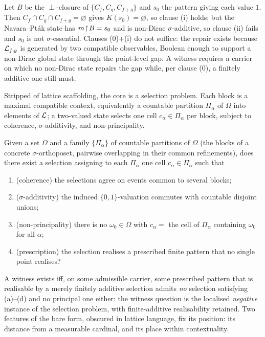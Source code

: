 \begin{remark}\label{rem:np-builds-rescuer}
Let $B$ be the $\perp$-closure of $\{C_f, C_g, C_{f+g}\}$ and $s_0$ the pattern
giving each value $1$. Then $C_f\cap C_g\cap C_{f+g}=\varnothing$ gives
$K(s_0)=\varnothing$, so clause (i) holds; but the Navara--Pt\'ak state has
$m\!\restriction\! B=s_0$ and is non-Dirac $\sigma$-additive, so clause (ii) fails and
$s_0$ is not $\sigma$-essential. Clauses (0)+(i) do not suffice: the repair
exists because $\mathcal{L}_{f,g}$ is generated by two compatible observables, Boolean
enough to support a non-Dirac global state through the point-level gap. A witness
requires a carrier on which no non-Dirac state repairs the gap while, per clause
(0), a finitely additive one still must.
\end{remark}

Stripped of lattice scaffolding, the core is a selection problem. Each block is
a maximal compatible context, equivalently a countable partition $\Pi_\alpha$ of
$\Omega$ into elements of $\mathcal{L}$; a two-valued state selects one cell
$c_\alpha\in\Pi_\alpha$ per block, subject to coherence, $\sigma$-additivity, and
non-principality.

\begin{question}\label{q:bare}
Given a set $\Omega$ and a family $\{\Pi_\alpha\}$ of countable partitions of
$\Omega$ (the blocks of a concrete $\sigma$-orthoposet, pairwise overlapping in
their common refinements), does there exist a selection assigning to each
$\Pi_\alpha$ one cell $c_\alpha\in\Pi_\alpha$ such that
\begin{enumerate}[label=\textup{(\alph*)}]
  \item (coherence) the selections agree on events common to several blocks;
  \item ($\sigma$-additivity) the induced $\{0,1\}$-valuation commutes with
    countable disjoint unions;
  \item (non-principality) there is no $\omega_0\in\Omega$ with $c_\alpha=$ the
    cell of $\Pi_\alpha$ containing $\omega_0$ for all $\alpha$;
  \item (prescription) the selection realises a prescribed finite pattern that no
    single point realises?
\end{enumerate}
A witness exists iff, on some admissible carrier, some prescribed pattern that is
realisable by a merely finitely additive selection admits \emph{no} selection
satisfying \textup{(a)}--\textup{(d)} and no principal one either: the witness
question is the localised \emph{negative} instance of the selection problem, with
finite-additive realisability retained. Two features of the bare form, obscured
in lattice language, fix its position: its distance from a measurable cardinal,
and its place within contextuality.
\end{question}

